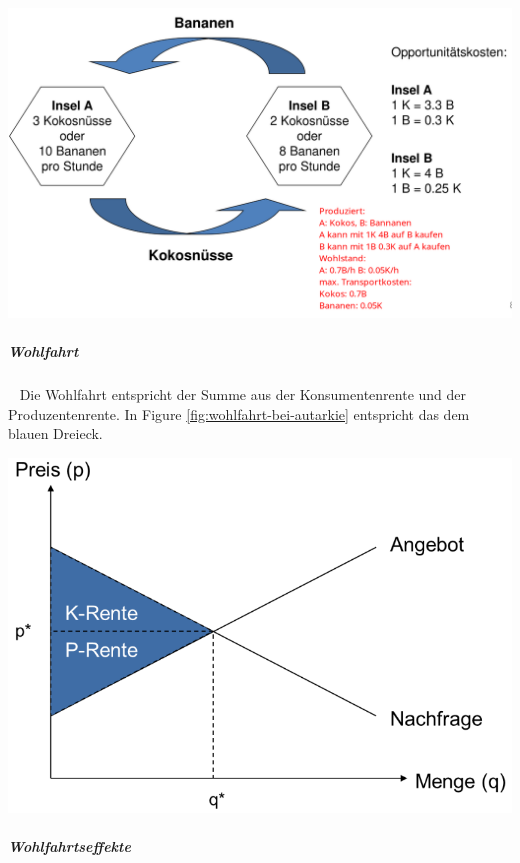 \documentclass[11pt,twoside,landscape]{article}
\begin{document}
\begin{multicols}{3}
{
\begin{center}
\includegraphics[width=.9\linewidth]{img/komparativen_kostenvorteils.png}
\end{center}
\label{fig:komparativen-kostenvorteil}
}

\subparagraph{Wohlfahrt} \
\label{sec:orgbcb5e44}
Die Wohlfahrt entspricht der Summe aus der Konsumentenrente und der Produzentenrente.
In Figure \ref{fig:wohlfahrt-bei-autarkie} entspricht das dem blauen Dreieck.

{
\begin{center}
\includegraphics[width=.9\linewidth]{img/wohlfahrt_bei_autarkie.png}
\end{center}
\label{fig:wohlfahrt-bei-autarkie}
}

\subparagraph{Wohlfahrtseffekte} \
\label{sec:org4e76770}


\end{multicols}
\end{document}
